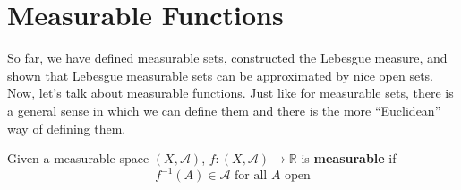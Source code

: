 \section{Measurable Functions}

  So far, we have defined measurable sets, constructed the Lebesgue measure, and shown that Lebesgue measurable sets can be approximated by nice open sets. Now, let's talk about measurable functions. Just like for measurable sets, there is a general sense in which we can define them and there is the more ``Euclidean'' way of defining them. 

  \begin{definition}
    Given a measurable space $(X, \mathcal{A})$, $f: (X, \mathcal{A}) \longrightarrow \mathbb{R}$ is \textbf{measurable} if 
    \begin{equation}
      f^{-1}(A) \in \mathcal{A} \text{ for all } A \text{ open}
    \end{equation}
  \end{definition}

